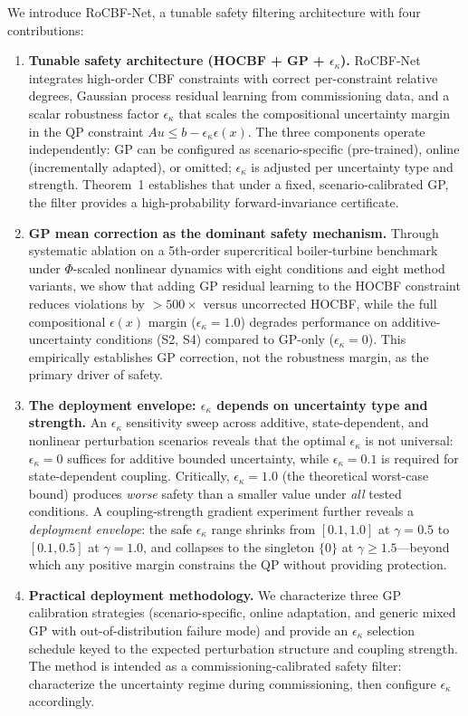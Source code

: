 We introduce RoCBF-Net, a tunable safety filtering architecture with four contributions:

\begin{enumerate}
    \item \textbf{Tunable safety architecture (HOCBF + GP + $\epsilon_\kappa$).} RoCBF-Net integrates high-order CBF constraints with correct per-constraint relative degrees, Gaussian process residual learning from commissioning data, and a scalar robustness factor $\epsilon_\kappa$ that scales the compositional uncertainty margin in the QP constraint $Au \leq b - \epsilon_\kappa\epsilon(x)$. The three components operate independently: GP can be configured as scenario-specific (pre-trained), online (incrementally adapted), or omitted; $\epsilon_\kappa$ is adjusted per uncertainty type and strength. Theorem~1 establishes that under a fixed, scenario-calibrated GP, the filter provides a high-probability forward-invariance certificate.

    \item \textbf{GP mean correction as the dominant safety mechanism.} Through systematic ablation on a 5th-order supercritical boiler-turbine benchmark under $\Phi$-scaled nonlinear dynamics with eight conditions and eight method variants, we show that adding GP residual learning to the HOCBF constraint reduces violations by $>500\times$ versus uncorrected HOCBF, while the full compositional $\epsilon(x)$ margin ($\epsilon_\kappa=1.0$) degrades performance on additive-uncertainty conditions (S2, S4) compared to GP-only ($\epsilon_\kappa=0$). This empirically establishes GP correction, not the robustness margin, as the primary driver of safety.

    \item \textbf{The deployment envelope: $\epsilon_\kappa$ depends on uncertainty type and strength.} An $\epsilon_\kappa$ sensitivity sweep across additive, state-dependent, and nonlinear perturbation scenarios reveals that the optimal $\epsilon_\kappa$ is not universal: $\epsilon_\kappa=0$ suffices for additive bounded uncertainty, while $\epsilon_\kappa=0.1$ is required for state-dependent coupling. Critically, $\epsilon_\kappa=1.0$ (the theoretical worst-case bound) produces \emph{worse} safety than a smaller value under \emph{all} tested conditions. A coupling-strength gradient experiment further reveals a \emph{deployment envelope}: the safe $\epsilon_\kappa$ range shrinks from $[0.1,1.0]$ at $\gamma=0.5$ to $[0.1,0.5]$ at $\gamma=1.0$, and collapses to the singleton $\{0\}$ at $\gamma\geq1.5$---beyond which any positive margin constrains the QP without providing protection.

    \item \textbf{Practical deployment methodology.} We characterize three GP calibration strategies (scenario-specific, online adaptation, and generic mixed GP with out-of-distribution failure mode) and provide an $\epsilon_\kappa$ selection schedule keyed to the expected perturbation structure and coupling strength. The method is intended as a commissioning-calibrated safety filter: characterize the uncertainty regime during commissioning, then configure $\epsilon_\kappa$ accordingly.
\end{enumerate}

